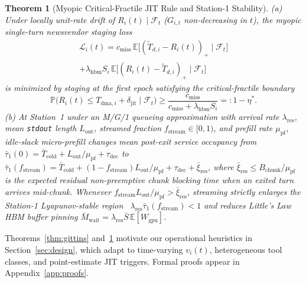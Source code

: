 \documentclass[10pt,journal,compsoc]{IEEEtran}
\newtheorem{theorem}{Theorem}
\theoremstyle{definition}
\theoremstyle{remark}
\newcommand{\E}{\mathbb{E}}
\newcommand{\Prob}{\mathbb{P}}
\begin{document}
\begin{theorem}[Myopic Critical-Fractile JIT Rule and Station-1 Stability]\label{thm:jit}
(a) Under locally unit-rate drift of $R_i(t) \mid \mathcal{F}_t$ ($G_{i,t}$ non-decreasing in $t$), the myopic single-turn newsvendor staging loss
\begin{multline}\label{eq:jit_loss}
\mathcal{L}_i(t) = c_{\mathrm{miss}}\,\E\bigl[(\tilde{T}_{d,i} - R_i(t))_+ \mid \mathcal{F}_t\bigr] \\
+ \lambda_{\mathrm{hbm}} S_i\,\E\bigl[(R_i(t) - \tilde{T}_{d,i})_+ \mid \mathcal{F}_t\bigr]
\end{multline}
is minimized by staging at the first epoch satisfying the critical-fractile boundary
\begin{equation}\label{eq:jit_thresh}
\Prob\bigl(R_i(t) \le T_{\mathrm{dma},i} + \delta_{\mathrm{jit}} \;\big|\; \mathcal{F}_t\bigr) \ge \frac{c_{\mathrm{miss}}}{c_{\mathrm{miss}} + \lambda_{\mathrm{hbm}} S_i} =: 1 - \eta^*.
\end{equation}
(b) At Station~1 under an M/G/1 queueing approximation with arrival rate $\lambda_{\mathrm{res}}$, mean \texttt{stdout} length $L_{\mathrm{out}}$, streamed fraction $f_{\mathrm{stream}} \in [0, 1)$, and prefill rate $\mu_{\mathrm{pf}}$, idle-slack micro-prefill changes mean post-exit service occupancy from $\bar{\tau}_1(0) = \bar{T}_{\mathrm{cold}} + L_{\mathrm{out}}/\mu_{\mathrm{pf}} + \tau_{\mathrm{dec}}$ to $\bar{\tau}_1(f_{\mathrm{stream}}) = \bar{T}_{\mathrm{cold}} + (1 - f_{\mathrm{stream}})L_{\mathrm{out}}/\mu_{\mathrm{pf}} + \tau_{\mathrm{dec}} + \bar{\xi}_{\mathrm{res}}$, where $\bar{\xi}_{\mathrm{res}} \le B_{\mathrm{chunk}}/\mu_{\mathrm{pf}}$ is the expected residual non-preemptive chunk blocking time when an exited turn arrives mid-chunk. Whenever $f_{\mathrm{stream}} L_{\mathrm{out}}/\mu_{\mathrm{pf}} > \bar{\xi}_{\mathrm{res}}$, streaming strictly enlarges the Station-1 Lyapunov-stable region~\cite{neely2010stochastic} $\lambda_{\mathrm{res}} \bar{\tau}_1(f_{\mathrm{stream}}) < 1$ and reduces Little's Law HBM buffer pinning $\bar{M}_{\mathrm{wait}} = \lambda_{\mathrm{res}} \bar{S}\,\E[W_{\mathrm{gpu}}]$.
\end{theorem}

Theorems~\ref{thm:gittins} and~\ref{thm:jit} motivate our operational heuristics in Section~\ref{sec:design}, which adapt to time-varying $v_i(t)$, heterogeneous tool classes, and point-estimate JIT triggers. Formal proofs appear in Appendix~\ref{app:proofs}.

\end{document}
